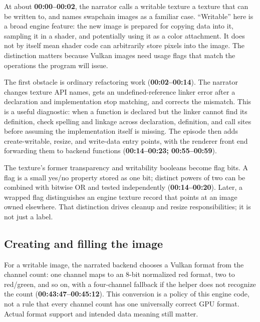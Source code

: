 At about \textbf{00:00--00:02}, the narrator calls a writable texture a texture that can be written to, and names swapchain images as a familiar case. ``Writable'' here is a broad engine feature: the new image is prepared for copying data into it, sampling it in a shader, and potentially using it as a color attachment. It does not by itself mean shader code can arbitrarily store pixels into the image. The distinction matters because Vulkan images need usage flags that match the operations the program will issue.

The first obstacle is ordinary refactoring work (\textbf{00:02--00:14}). The narrator changes texture API names, gets an undefined-reference linker error after a declaration and implementation stop matching, and corrects the mismatch. This is a useful diagnostic: when a function is declared but the linker cannot find its definition, check spelling and linkage across declaration, definition, and call sites before assuming the implementation itself is missing. The episode then adds create-writable, resize, and write-data entry points, with the renderer front end forwarding them to backend functions (\textbf{00:14--00:23; 00:55--00:59}).

The texture's former transparency and writability booleans become flag bits. A flag is a small yes/no property stored as one bit; distinct powers of two can be combined with bitwise OR and tested independently (\textbf{00:14--00:20}). Later, a wrapped flag distinguishes an engine texture record that points at an image owned elsewhere. That distinction drives cleanup and resize responsibilities; it is not just a label.

\subsection{Creating and filling the image}\label{06-engine-ii-ch026-creating-and-filling-the-image}

\hypertarget{06-engine-ii-ch026-creating-and-filling-the-image}{}

For a writable image, the narrated backend chooses a Vulkan format from the channel count: one channel maps to an 8-bit normalized red format, two to red/green, and so on, with a four-channel fallback if the helper does not recognize the count (\textbf{00:43:47--00:45:12}). This conversion is a policy of this engine code, not a rule that every channel count has one universally correct GPU format. Actual format support and intended data meaning still matter.

